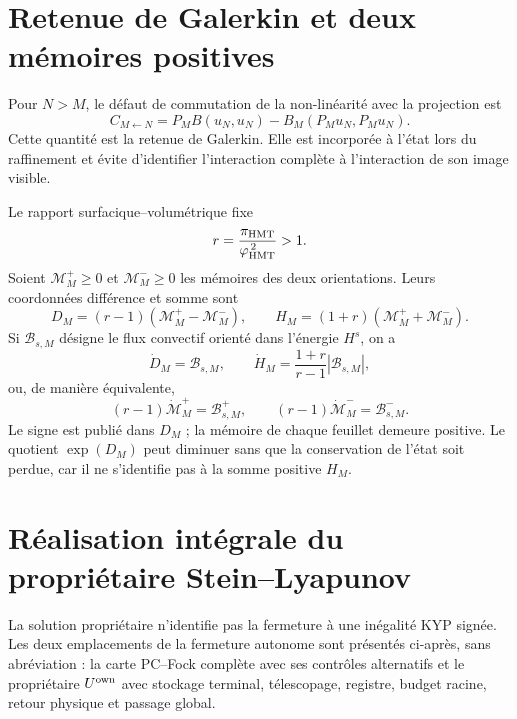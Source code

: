 \section*{Retenue de Galerkin et deux mémoires positives}

Pour \(N>M\), le défaut de commutation de la non-linéarité avec la
projection est
\begin{equation}\label{eq:realizaciones-ns-acarreo}
 C_{M\leftarrow N}
 =P_MB(u_N,u_N)-B_M(P_Mu_N,P_Mu_N).
\end{equation}
Cette quantité est la retenue de Galerkin. Elle est incorporée à l'état lors du raffinement et
évite d'identifier l'interaction complète à l'interaction de son image
visible.

Le rapport surfacique--volumétrique fixe
\begin{equation}\label{eq:realizaciones-ns-r}
 r=\frac{\pi_{\rm HMT}}{\varphi_{\rm HMT}^{\,2}}>1.
\end{equation}
Soient \(\mathcal M_M^+\geq0\) et \(\mathcal M_M^-\geq0\) les mémoires des deux orientations.
Leurs coordonnées différence et somme sont
\begin{equation}\label{eq:realizaciones-ns-dh}
 D_M=(r-1)(\mathcal M_M^+-\mathcal M_M^-),
 \qquad
 H_M=(1+r)(\mathcal M_M^++\mathcal M_M^-).
\end{equation}
Si \(\mathcal B_{s,M}\) désigne le flux convectif orienté dans l'énergie
\(H^s\), on a
\begin{equation}\label{eq:realizaciones-ns-dh-derivadas}
 \dot D_M=\mathcal B_{s,M},
 \qquad
 \dot H_M=\frac{1+r}{r-1}|\mathcal B_{s,M}|,
\end{equation}
ou, de manière équivalente,
\begin{equation}\label{eq:realizaciones-ns-memorias-positivas}
 (r-1)\dot{\mathcal M}_M^+=\mathcal B_{s,M}^{+},
 \qquad
 (r-1)\dot{\mathcal M}_M^-=\mathcal B_{s,M}^{-}.
\end{equation}
Le signe est publié dans \(D_M\) ; la mémoire de chaque feuillet demeure positive.
Le quotient \(\exp(D_M)\) peut diminuer sans que la conservation
de l'état soit perdue, car il ne s'identifie pas à la somme positive \(H_M\).

\section*{Réalisation intégrale du propriétaire Stein--Lyapunov}

La solution propriétaire n'identifie pas la fermeture à une inégalité KYP
signée. Les deux emplacements de la fermeture autonome sont présentés ci-après,
sans abréviation : la carte PC--Fock complète avec ses contrôles
alternatifs et le propriétaire \(U^{\rm own}\) avec stockage terminal,
télescopage, registre, budget racine, retour physique et passage global.

